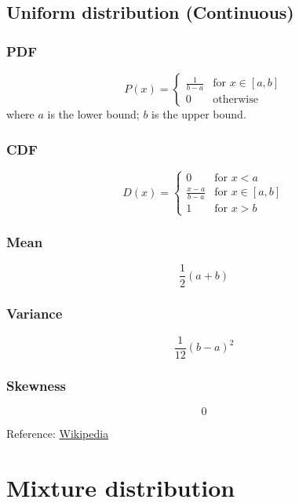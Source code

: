 \subsection{Uniform distribution (Continuous)}

\subsubsection*{PDF}
\[
    P(x) = \begin{cases}
        {\frac {1}{b-a}}&{\text{for }}x\in [a,b]\\
        0&{\text{otherwise}}
    \end{cases}
\]
where $a$ is the lower bound; $b$ is the upper bound.

\subsubsection*{CDF}
\[
    D(x) = \begin{cases}
        0&{\text{for }}x<a\\
        {\frac {x-a}{b-a}}&{\text{for }}x\in [a,b]\\
        1&{\text{for }}x>b
    \end{cases}
\]

\subsubsection*{Mean}
\[
    \frac{1}{2}(a+b)
\]

\subsubsection*{Variance}
\[
    \frac{1}{12}(b-a)^2
\]

\subsubsection*{Skewness}
\[
    0
\]

Reference:
\href{https://en.wikipedia.org/wiki/Continuous_uniform_distribution}{Wikipedia}


\section{Mixture distribution}

